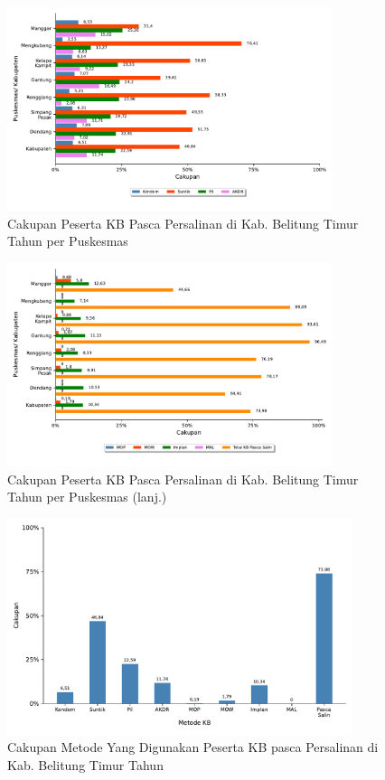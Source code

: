 \begin{figure}[H]
    \centering
    \includegraphics[width=0.85\textwidth]{bab_05/bab_05_07_KBpascaSalin_a}
    \caption{Cakupan Peserta KB Pasca Persalinan di Kab. Belitung Timur Tahun \tP per Puskesmas}
    \label{fig:Cakupan-KB-pascaSalin-a}
\end{figure}

\begin{figure}[H]
    \centering
    \includegraphics[width=0.85\textwidth]{bab_05/bab_05_07_KBpascaSalin_b}
    \caption{Cakupan Peserta KB Pasca Persalinan di Kab. Belitung Timur Tahun \tP per Puskesmas (lanj.)}
    \label{fig:Cakupan-KB-pascaSalin-b}
\end{figure}

\begin{figure}[H]
    \centering
    \includegraphics[width=0.9\textwidth]{bab_05/bab_05_07_KBpascaSalin_c}
    \caption{Cakupan Metode Yang Digunakan Peserta KB pasca Persalinan di Kab. Belitung Timur Tahun \tP}
    \label{fig:Cakupan-KB-pascaSalin-c}
\end{figure}

